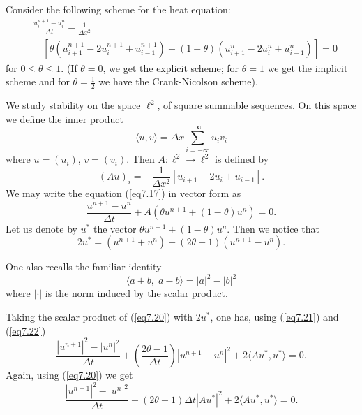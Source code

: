 \begin{exam}\label{chap7:exam7.6}
Consider the following scheme for the heat equation:
\begin{align*}
&\frac{u^{n+1}_i - u^n_i}{\Delta t} - \frac{1}{\Delta x^2}\\ 
  & \quad \left[ \theta
  (u^{n+1}_{i+1} - 2 u^{n+1}_i + u^{n+1}_{i-1}) + (1-\theta) (u^n_{i+1} - 2
  u^n_i + u^n_{i-1})   \right] =0
\tag{7.17}\label{eq7.17}
\end{align*}
for $0 \leq \theta \leq 1$. (If $\theta = 0$, we get the explicit
scheme; for $\theta =1$ we get the implicit scheme and for $\theta
=\frac{1}{2}$ we have the Crank-Nicolson scheme).

We study stability on the space $\ell^2$, of square summable
sequences. On this space we define the inner product
\begin{equation*}
\langle u,v \rangle  = \Delta x \sum\limits^\infty_{i=-\infty} u_i v_i
\tag{7.18} \label{eq7.18}
\end{equation*}
where $u= (u_i)$, $v= (v_i)$. Then $A: \ell^2 \to \ell^2$ is defined
by 
\begin{equation*}
(Au)_i = - \frac{1}{\Delta x^2} \left[ u_{i+1} - 2 u_i + u_{i-1}
    \right]. \tag{7.19}\label{eq7.19}
\end{equation*}
We may write the equation (\ref{eq7.17}) in vector form as 
\begin{equation*}
\frac{u^{n+1} -u^n}{\Delta t} + A(\theta u^{n+1} + (1-\theta) u^n) =
0. \tag{7.20}\label{eq7.20}
\end{equation*}
Let us denote by $u^*$ the vector $\theta u^{n+1} +
(1-\theta)u^n$. Then we notice that 
\begin{equation*}
2u^* = (u^{n+1} + u^n) + (2\theta -1) (u^{n+1} - u^n) . 
\tag{7.21}\label{eq7.21}
\end{equation*}

One also recalls the familiar identity
\begin{equation*}
\langle a + b, \; a -b\rangle =|a|^2 - |b|^2
\tag{7.22}\label{eq7.22}
\end{equation*}\pageoriginale 
where $|\cdot|$ is the norm induced by the scalar product.

Taking the scalar product of (\ref{eq7.20}) with $2u^*$, one has, using
(\ref{eq7.21}) and (\ref{eq7.22})
$$ 
\frac{|u^{n+1}|^2 - |u^n|^2}{\Delta t} + \left(\frac{2\theta-1}{\Delta t}\right)
|u^{n+1} -u^n|^2 + 2 \langle Au^*, u^*\rangle  = 0. 
$$
Again, using (\ref{eq7.20}) we get 
\begin{equation*}
\frac{|u^{n+1}|^2 - |u^n|^2}{\Delta t} + (2\theta -1) \Delta t
|Au^*|^2 + 2 \langle Au^*, u^*\rangle  = 0.\tag{7.23}\label{eq7.23}
\end{equation*}


\end{exam}
